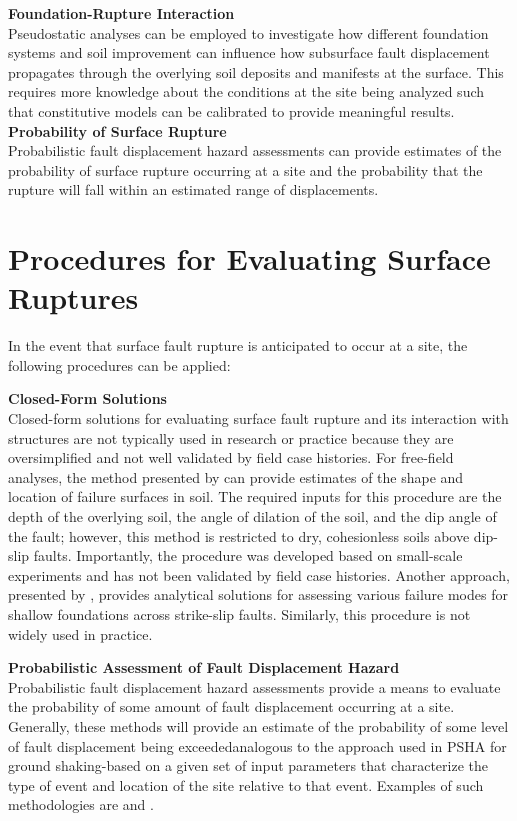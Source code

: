 \noindent\textbf{Foundation-Rupture Interaction}\\
Pseudostatic analyses can be employed to investigate how different foundation systems and soil improvement can influence how subsurface fault displacement propagates through the overlying soil deposits and manifests at the surface. This requires more knowledge about the conditions at the site being analyzed such that constitutive models can be calibrated to provide meaningful results.\\

\noindent\textbf{Probability of Surface Rupture}\\
Probabilistic fault displacement hazard assessments can provide estimates of the probability of surface rupture occurring at a site and the probability that the rupture will fall within an estimated range of displacements.\\

\section{Procedures for Evaluating Surface Ruptures}
\label{sec:eq_surface_rup_procedures}

In the event that surface fault rupture is anticipated to occur at a site, the following procedures can be applied:
\newline

\noindent\textbf{Closed-Form Solutions} \\
Closed-form solutions for evaluating surface fault rupture and its interaction with structures are not typically used in research or practice because they are oversimplified and not well validated by field case histories. For free-field analyses, the method presented by \cite{cole1984influence} can provide estimates of the shape and location of failure surfaces in soil. The required inputs for this procedure are the depth of the overlying soil, the angle of dilation of the soil, and the dip angle of the fault; however, this method is restricted to dry, cohesionless soils above dip-slip faults.  Importantly, the procedure was developed based on small-scale experiments and has not been validated by field case histories. Another approach, presented by \cite{berrill1983twodimensional}, provides analytical solutions for assessing various failure modes for shallow foundations across strike-slip faults. Similarly, this procedure is not widely used in practice.
\newline

\noindent\textbf{Probabilistic Assessment of Fault Displacement Hazard}\\
Probabilistic fault displacement hazard assessments provide a means to evaluate the probability of some amount of fault displacement occurring at a site. Generally, these methods will provide an estimate of the probability of some level of fault displacement being exceeded\textemdash analogous to the approach used in PSHA for ground shaking-based on a given set of input parameters that characterize the type of event and location of the site relative to that event. Examples of such methodologies are \cite{youngs2003a, petersen2011fault, moss2011probabilistic} and \cite{hecker2013variability}.\\

